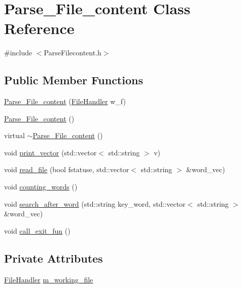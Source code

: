 \hypertarget{class_parse___file__content}{}\section{Parse\+\_\+\+File\+\_\+content Class Reference}
\label{class_parse___file__content}


{\ttfamily \#include $<$Parse\+Filecontent.\+h$>$}

\subsection*{Public Member Functions}
\begin{DoxyCompactItemize}
\item 
\mbox{\hyperlink{class_parse___file__content_a1f24218f4f9a445f020381139bb7dc9f}{Parse\+\_\+\+File\+\_\+content}} (\mbox{\hyperlink{class_file_handler}{File\+Handler}} w\+\_\+f)
\item 
\mbox{\hyperlink{class_parse___file__content_a559ef5526225c22747225d5805ebcd86}{Parse\+\_\+\+File\+\_\+content}} ()
\item 
virtual \mbox{\hyperlink{class_parse___file__content_af3c8fc07e2f9a0fdafb596adbc1e167a}{$\sim$\+Parse\+\_\+\+File\+\_\+content}} ()
\item 
void \mbox{\hyperlink{class_parse___file__content_aa535d5103a95ab10efa158088c228354}{print\+\_\+vector}} (std\+::vector$<$ std\+::string $>$ v)
\item 
void \mbox{\hyperlink{class_parse___file__content_ab268b997f33a90a9ce0881a8571b44d2}{read\+\_\+file}} (bool fstatuse, std\+::vector$<$ std\+::string $>$ \&word\+\_\+vec)
\item 
void \mbox{\hyperlink{class_parse___file__content_ae3ba604aada833588554be25c5c9a607}{counting\+\_\+words}} ()
\item 
void \mbox{\hyperlink{class_parse___file__content_a945f2d6a47cc98bd34bb1f8290a8cb7c}{search\+\_\+after\+\_\+word}} (std\+::string key\+\_\+word, std\+::vector$<$ std\+::string $>$ \&word\+\_\+vec)
\item 
void \mbox{\hyperlink{class_parse___file__content_a87e06838393e70610ae87439c22031ff}{call\+\_\+exit\+\_\+fun}} ()
\end{DoxyCompactItemize}
\subsection*{Private Attributes}
\begin{DoxyCompactItemize}
\item 
\mbox{\hyperlink{class_file_handler}{File\+Handler}} \mbox{\hyperlink{class_parse___file__content_a9c8b30de899c7c814c22b444146c54d9}{m\+\_\+working\+\_\+file}}
\end{DoxyCompactItemize}


